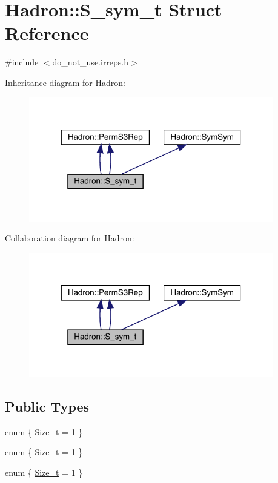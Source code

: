 \hypertarget{structHadron_1_1S__sym__t}{}\section{Hadron\+:\+:S\+\_\+sym\+\_\+t Struct Reference}
\label{structHadron_1_1S__sym__t}


{\ttfamily \#include $<$do\+\_\+not\+\_\+use.\+irreps.\+h$>$}



Inheritance diagram for Hadron\+:\nopagebreak
\begin{figure}[H]
\begin{center}
\leavevmode
\includegraphics[width=302pt]{de/dee/structHadron_1_1S__sym__t__inherit__graph}
\end{center}
\end{figure}


Collaboration diagram for Hadron\+:\nopagebreak
\begin{figure}[H]
\begin{center}
\leavevmode
\includegraphics[width=302pt]{d9/d7b/structHadron_1_1S__sym__t__coll__graph}
\end{center}
\end{figure}
\subsection*{Public Types}
\begin{DoxyCompactItemize}
\item 
enum \{ \mbox{\hyperlink{structHadron_1_1S__sym__t_aeda306455b317dba7734293ab74c8390a1425783a12f6062d3bf3449dbd46dc20}{Size\+\_\+t}} = 1
 \}
\item 
enum \{ \mbox{\hyperlink{structHadron_1_1S__sym__t_aeda306455b317dba7734293ab74c8390a1425783a12f6062d3bf3449dbd46dc20}{Size\+\_\+t}} = 1
 \}
\item 
enum \{ \mbox{\hyperlink{structHadron_1_1S__sym__t_aeda306455b317dba7734293ab74c8390a1425783a12f6062d3bf3449dbd46dc20}{Size\+\_\+t}} = 1
 \}
\end{DoxyCompactItemize}
